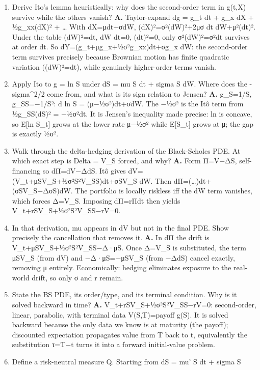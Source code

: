 \documentclass[
  11pt,
]{article}
\providecommand{\tightlist}{%
  \setlength{\itemsep}{0pt}\setlength{\parskip}{0pt}}
\begin{document}
\begin{enumerate}
\def\labelenumi{\arabic{enumi}.}
\tightlist
\item
  Derive Ito's lemma heuristically: why does the second-order term in
  g(t,X) survive while the others vanish? \textbf{A.} Taylor-expand dg =
  g\_t dt + g\_x dX + ½g\_xx(dX)² + \ldots{} With dX=μdt+σdW,
  (dX)²=σ²(dW)²+2μσ dt dW+μ²(dt)². Under the table (dW)²=dt, dW dt=0,
  (dt)²=0, only σ²(dW)²=σ²dt survives at order dt. So
  dY=(g\_t+μg\_x+½σ²g\_xx)dt+σg\_x dW: the second-order term survives
  precisely because Brownian motion has finite quadratic variation
  ((dW)²=dt), while genuinely higher-order terms vanish.
\item
  Apply Ito to g = ln S under dS = mu S dt + sigma S dW. Where does the
  -sigma\^{}2/2 come from, and what is its sign relation to Jensen?
  \textbf{A.} g\_S=1/S, g\_SS=−1/S²: d ln S = (μ−½σ²)dt+σdW. The −½σ² is
  the Itô term from ½g\_SS(dS)² = −½σ²dt. It is Jensen's inequality made
  precise: ln is concave, so E{[}ln S\_t{]} grows at the lower rate
  μ−½σ² while E{[}S\_t{]} grows at μ; the gap is exactly ½σ².
\item
  Walk through the delta-hedging derivation of the Black-Scholes PDE. At
  which exact step is Delta = V\_S forced, and why? \textbf{A.} Form
  Π=V−ΔS, self-financing so dΠ=dV−ΔdS. Itô gives
  dV=(V\_t+μSV\_S+½σ²S²V\_SS)dt+σSV\_S dW. Then
  dΠ=(\ldots)dt+(σSV\_S−ΔσS)dW. The portfolio is locally riskless iff
  the dW term vanishes, which forces Δ=V\_S. Imposing dΠ=rΠdt then
  yields V\_t+rSV\_S+½σ²S²V\_SS−rV=0.
\item
  In that derivation, mu appears in dV but not in the final PDE. Show
  precisely the cancellation that removes it. \textbf{A.} In dΠ the
  drift is V\_t+μSV\_S+½σ²S²V\_SS−Δ·μS. Once Δ=V\_S is substituted, the
  term μSV\_S (from dV) and −Δ·μS=−μSV\_S (from −ΔdS) cancel exactly,
  removing μ entirely. Economically: hedging eliminates exposure to the
  real-world drift, so only σ and r remain.
\item
  State the BS PDE, its order/type, and its terminal condition. Why is
  it solved backward in time? \textbf{A.} V\_t+rSV\_S+½σ²S²V\_SS−rV=0:
  second-order, linear, parabolic, with terminal data V(S,T)=payoff
  g(S). It is solved backward because the only data we know is at
  maturity (the payoff); discounted expectation propagates value from T
  back to t, equivalently the substitution τ=T−t turns it into a forward
  initial-value problem.
\item
  Define a risk-neutral measure Q. Starting from dS = mu' S dt + sigma S

\end{enumerate}
\end{document}
